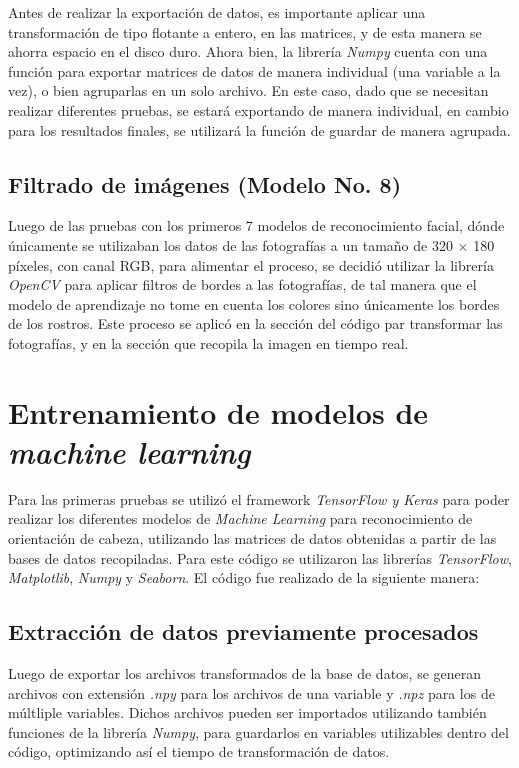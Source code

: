 Antes de realizar la exportación de datos, es importante aplicar una transformación de tipo flotante a entero, en las matrices, y de esta manera se ahorra espacio en el disco duro. Ahora bien, la librería \textit{Numpy} cuenta con una función para exportar matrices de datos de manera individual (una variable a la vez), o bien agruparlas en un solo archivo. En este caso, dado que se necesitan realizar diferentes pruebas, se estará exportando de manera individual, en cambio para los resultados finales, se utilizará la función de guardar de manera agrupada. 

\subsection{Filtrado de imágenes (Modelo No. 8)}
Luego de las pruebas con los primeros 7 modelos de reconocimiento facial, dónde únicamente se utilizaban los datos de las fotografías a un tamaño de 320 $\times$ 180 píxeles, con canal RGB, para alimentar el proceso, se decidió utilizar la librería \textit{OpenCV} para aplicar filtros de bordes a las fotografías, de tal manera que el modelo de aprendizaje no tome en cuenta los colores sino únicamente los bordes de los rostros. Este proceso se aplicó en la sección del código par transformar las fotografías, y en la sección que recopila la imagen en tiempo real. 

\section{Entrenamiento de modelos de \textit{machine learning}}
Para las primeras pruebas se utilizó el framework \textit{TensorFlow y Keras} para poder realizar los diferentes modelos de \textit{Machine Learning} para reconocimiento de orientación de cabeza, utilizando las matrices de datos obtenidas a partir de las bases de datos recopiladas. Para este código se utilizaron las librerías \textit{TensorFlow}, \textit{Matplotlib}, \textit{Numpy} y \textit{Seaborn}. El código fue realizado de la siguiente manera:

\subsection{Extracción de datos previamente procesados}
Luego de exportar los archivos transformados de la base de datos, se generan archivos con extensión \textit{.npy} para los archivos de una variable y \textit{.npz} para los de múltliple variables. Dichos archivos pueden ser importados utilizando también funciones de la librería \textit{Numpy}, para guardarlos en variables utilizables dentro del código, optimizando así el tiempo de transformación de datos.

